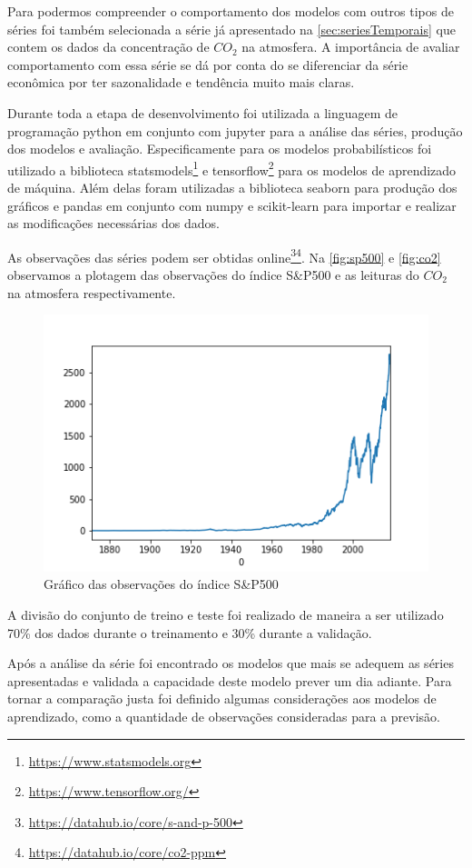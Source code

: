 \documentclass[
    12pt,
    oneside,
    a4paper,
    english,
    brazil
]{abntex2}
\begin{document}
Para   podermos   compreender   o   comportamento  dos   modelos   com   outros
tipos   de  séries   foi  também   selecionada  a   série  já   apresentado  na
\autoref{sec:seriesTemporais} que contem os dados  da concentração de $CO_2$ na
atmosfera. A  importância de  avaliar comportamento  com essa  série se  dá por
conta do  se diferenciar da  série econômica  por ter sazonalidade  e tendência
muito mais claras.

Durante  toda  a  etapa  de   desenvolvimento  foi  utilizada  a  linguagem  de
programação python em conjunto com jupyter  para a análise das séries, produção
dos modelos  e avaliação. Especificamente  para os modelos  probabilísticos foi
utilizado a  biblioteca statsmodels\footnote{\url{https://www.statsmodels.org}}
e  tensorflow\footnote{\url{https://www.tensorflow.org/}}  para os  modelos  de
aprendizado de máquina.  Além delas foram utilizadas a  biblioteca seaborn para
produção  dos gráficos  e  pandas em  conjunto com  numpy  e scikit-learn  para
importar e realizar as modificações necessárias dos dados.

As observações das séries podem ser obtidas
online\footnote{\url{https://datahub.io/core/s-and-p-500}}\footnote{\url{https://datahub.io/core/co2-ppm}}.
Na   \autoref{fig:sp500}  e   \autoref{fig:co2}  observamos   a  plotagem   das
observações  do   índice  S\&P500  e   as  leituras  do  $CO_2$   na  atmosfera
respectivamente.

\begin{figure}[ht]
    \centering
    \caption{Gráfico das observações do índice S\&P500}\label{fig:sp500}
    \includegraphics[width=.5\linewidth]{images/sp500.png}
\end{figure}

A  divisão do  conjunto  de treino  e  teste  foi realizado  de  maneira a  ser
utilizado 70\% dos dados durante o treinamento e 30\% durante a validação.

Após a análise da série foi encontrado os modelos que mais se adequem as séries
apresentadas e validada  a capacidade deste modelo prever um  dia adiante. Para
tornar a  comparação justa  foi definido algumas  considerações aos  modelos de
aprendizado, como a quantidade de observações consideradas para a previsão.
\end{document}
